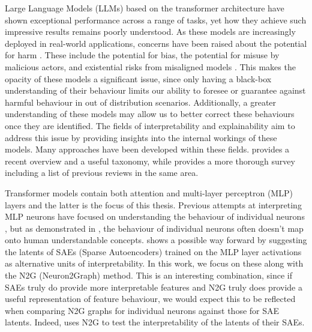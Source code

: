 Large Language Models (LLMs) based on the transformer architecture \parencite{vaswani_attention_2023} have shown exceptional performance across a range of tasks, yet how they achieve such impressive results remains poorly understood.
As these models are increasingly deployed in real-world applications, concerns have been raised about the potential for harm \parencite{noauthor_statement_nodate}\parencite{hendrycks_overview_2023}.
These include the potential for bias, the potential for misuse by malicious actors, and existential risks from misaligned models \parencite{ngo_alignment_2024}.
This makes the opacity of these models a significant issue, since only having a black-box understanding of their behaviour limits our ability to foresee or guarantee against harmful behaviour in out of distribution scenarios.
Additionally, a greater understanding of these models may allow us to better correct these behaviours once they are identified.
The fields of interpretability and explainability aim to address this issue by providing insights into the internal workings of these models.
Many approaches have been developed within these fields.
\textcite{bereska_mechanistic_2024} provides a recent overview and a useful taxonomy, while \textcite{rauker_toward_2023} provides a more thorough survey including a list of previous reviews in the same area.

Transformer models contain both attention and multi-layer perceptron (MLP) layers and the latter is the focus of this thesis.
Previous attempts at interpreting MLP neurons have focused on understanding the behaviour of individual neurons \parencite{wang_interpretability_2022}, but as demonstrated in \textcite{elhage_toy_2022}, the behaviour of individual neurons often doesn't map onto human understandable concepts.
\textcite{bricken_towards_2023} shows a possible way forward by suggesting the latents of SAEs (Sparse Autoencoders) trained on the MLP layer activations as alternative units of interpretability.
In this work, we focus on these along with the N2G (Neuron2Graph) \parencite{foote_neuron_2023} method.
This is an interesting combination, since if SAEs truly do provide more interpretable features and N2G truly does provide a useful representation of feature behaviour, we would expect this to be reflected when comparing N2G graphs for individual neurons against those for SAE latents.
Indeed, \textcite{gao_scaling_2024} uses N2G to test the interpretability of the latents of their SAEs.

